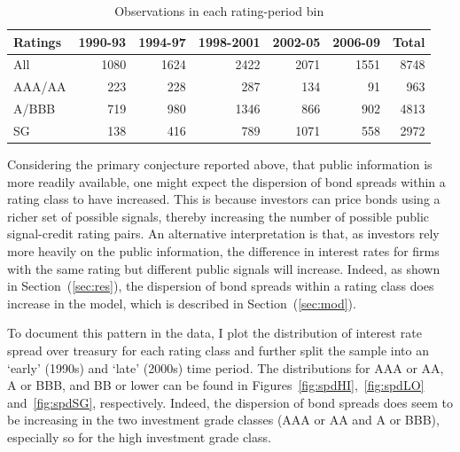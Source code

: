 \documentclass[titlepage]{article}
\begin{document}
\begin{table}\centering
\begin{tabular}{l *{6}r}
\toprule
Ratings & 1990-93 & 1994-97 & 1998-2001 & 2002-05 & 2006-09 & Total\\ \midrule
All & 1080 & 1624 & 2422 & 2071 & 1551 & 8748\\
AAA/AA & 223 & 228 & 287 & 134 & 91 & 963\\ 
A/BBB & 719 & 980 & 1346 & 866 & 902 & 4813\\ 
SG & 138 & 416 & 789 & 1071 & 558 & 2972\\ 
\bottomrule
\end{tabular}
\caption{Observations in each rating-period bin}
\label{tab:sample}
\end{table}

Considering the primary conjecture reported above, that public information is more readily available, one might expect the dispersion of bond spreads within a rating class to have increased. This is because investors can price bonds using a richer set of possible signals, thereby increasing the number of possible public signal-credit rating pairs. An alternative interpretation is that, as investors rely more heavily on the public information, the difference in interest rates for firms with the same rating but different public signals will increase. Indeed, as shown in Section~(\ref{sec:res}), the dispersion of bond spreads within a rating class does increase in the model, which is described in Section~(\ref{sec:mod}).

To document this pattern in the data, I plot the distribution of interest rate spread over treasury for each rating class and further split the sample into an `early' (1990s) and `late' (2000s) time period. The distributions for AAA or AA, A or BBB, and BB or lower can be found in Figures~\ref{fig:spdHI},~\ref{fig:spdLO} and~\ref{fig:spdSG}, respectively. Indeed, the dispersion of bond spreads does seem to be increasing in the two investment grade classes (AAA or AA and A or BBB), especially so for the high investment grade class. 
\end{document}
